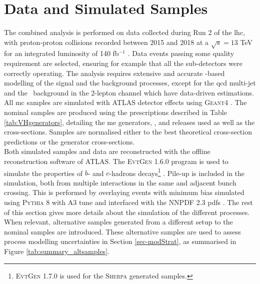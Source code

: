 \section{Data and Simulated Samples}\label{sec-datasets} 
The combined analysis is performed on data collected during Run 2 of the \gls{lhc}, with proton-proton collisions recorded between 2015 and 2018 at a $\sqrt{s} = 13$ TeV for an integrated luminosity of 140 fb$^{-1}$ \cite{ATLAS:2022hro}. Data events passing some quality requirement are selected, ensuring for example that all the sub-detectors were correctly operating. The analysis requires extensive and accurate -based modelling of the signal and the background processes, except for the \gls{qcd} multi-jet and the \ttb\ background in the 2-lepton channel which have data-driven estimations. All \gls{mc} samples are simulated with ATLAS detector effects \cite{ATLASSimulationInfra} using \textsc{Geant4} \cite{Agostinelli:602040}. The nominal samples are produced using the prescriptions described in Table \ref{tab:VHgenerators}, detailing the \gls{me} generators, , and  releases used as well as the cross-sections. Samples are normalised either to the best theoretical cross-section predictions or the generator cross-sections. \\



Both simulated samples and data are reconstructed with the offline reconstruction software of ATLAS. The \textsc{EvtGen} 1.6.0 program is used to simulate the properties of $b$- and $c$-hadrons decays\footnote{\textsc{EvtGen} 1.7.0 is used for the \textsc{Sherpa} generated samples.} \cite{LANGE2001152}. Pile-up is included in the simulation, both from multiple interactions in the same and adjacent bunch crossing. This is performed by overlaying events with minimum bias simulated using \textsc{\textsc{Pythia}} 8 with A3 tune and interfaced with the \textsc{NNPDF} 2.3 \glspl{pdf} \cite{SJOSTRAND2015159}. The rest of this section gives more details about the simulation of the different processes. When relevant, alternative samples generated from a different setup to the nominal samples are introduced. These alternative samples are used to assess process modelling uncertainties in Section \ref{sec-modStrat}, as summarised in Figure \ref{tab:summary_altsamples}.

